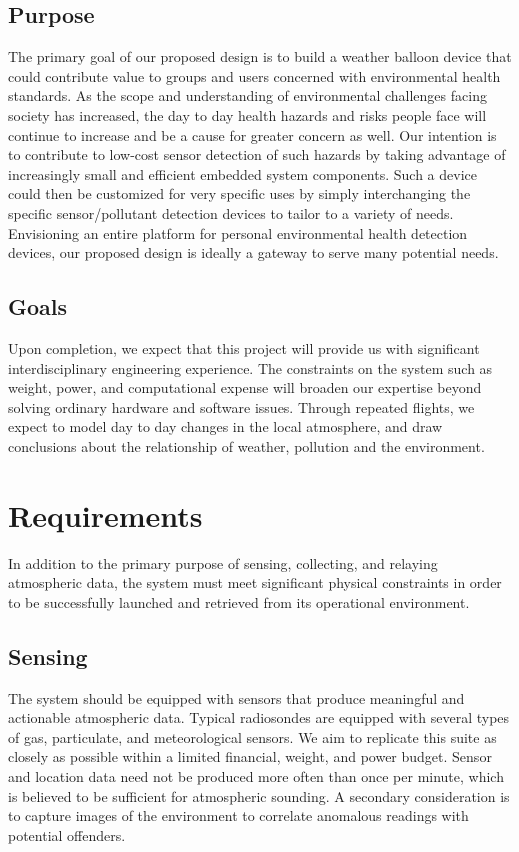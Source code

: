 \documentclass[conference,compsoc]{IEEEtran}
\begin{document}
\subsection{Purpose}
The primary goal of our proposed design is to build a weather balloon device that could contribute value to groups and users concerned with environmental health standards. As the scope and understanding of environmental challenges facing society has increased, the day to day health hazards and risks people face will continue to increase and be a cause for greater concern as well. Our intention is to contribute to low-cost sensor detection of such hazards by taking advantage of increasingly small and efficient embedded system components. Such a device could then be customized for very specific uses by simply interchanging the specific sensor/pollutant detection devices to tailor to a variety of needs.  Envisioning an entire platform for personal environmental health detection devices, our proposed design is ideally a gateway to serve many potential needs.
  
\subsection{Goals}
  Upon completion, we expect that this project will provide us with significant interdisciplinary engineering experience.  The constraints on the system such as weight, power, and computational expense will broaden our expertise beyond solving ordinary hardware and software issues.  Through repeated flights, we expect to model day to day changes in the local atmosphere, and draw conclusions about the relationship of weather, pollution and the environment.

\section{Requirements}
In addition to the primary purpose of sensing, collecting, and relaying atmospheric data, the system must meet significant physical constraints in order to be successfully launched and retrieved from its operational environment.  
\subsection{Sensing}
The system should be equipped with sensors that produce meaningful and actionable atmospheric data.  Typical radiosondes are equipped with several types of gas, particulate, and meteorological sensors.  We aim to replicate this suite as closely as possible within a limited financial, weight, and power budget.  Sensor and location data need not be produced more often than once per minute, which is believed to be sufficient for atmospheric sounding. A secondary consideration is to capture images of the environment to correlate anomalous readings with potential offenders. 
\end{document}

